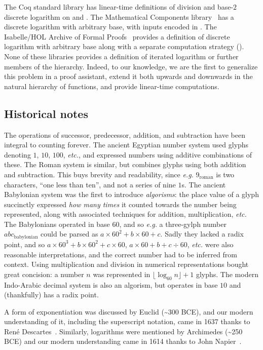 
%

The Coq standard library has linear-time definitions
of division and base-$2$ discrete logarithm on  and .
The Mathematical Components library~\cite{MathComp}
has a discrete logarithm with arbitrary base, with inputs encoded in .
The Isabelle/HOL Archive of Formal Proofs~\cite{isastan2019} 
provides a definition of discrete logarithm
with arbitrary base along with a separate computation strategy (\lstset{style=isaStyle}\li{[code]}\lstset{style=myStyle}).
None of these libraries provides a definition of iterated logarithm or
further members of the hierarchy.
Indeed, to our knowledge, we are the first to generalize this
problem in a proof assistant, extend it both
upwards and downwards in the natural hierarchy of functions, and
provide linear-time computations.

\subsection{Historical notes}
The operations of successor, predecessor, addition, and subtraction have
been integral to counting forever. The ancient Egyptian
number system used glyphs denoting $1$, $10$, $100$, \emph{etc.},
and expressed numbers using additive combinations of these.
The Roman system is similar, but
combines glyphs using both addition and subtraction.
This buys brevity and readability,
since \emph{e.g.} $9_{\text{roman}}$ is two characters, ``one less than ten'',
and not a series of nine $1$s.
The ancient Babylonian system was the first to introduce 
\emph{algorisms}: the place value of a glyph succinctly expressed \emph{how many times} 
it counted towards the number being represented, along with associated techniques for addition, multiplication, \emph{etc.}
The Babylonians operated in
base $60$, and so \emph{e.g.} a three-gylph number $abc_{\text{babylonian}}$ could
be parsed as $a \times 60^2 + b \times 60 + c$. Sadly they lacked
a radix point, and so
$a \times 60^3 + b \times 60^2 + c \times 60$, $a \times 60 + b + c \div 60$,
\emph{etc.} were also reasonable interpretations, and the correct number had
to be inferred from context.
Using multiplication and division in numerical representations bought great concision: a number $n$ was
represented in $\lfloor \log_{60}n \rfloor + 1$ glyphs.
The modern Indo-Arabic decimal system is also an algorism, 
but operates in base $10$ and (thankfully) has a radix point.

A form of exponentiation was discussed by Euclid (\textasciitilde 300 BCE), and our modern
understanding of it, including the superscript notation,
came in 1637 thanks to René Descartes~\cite{descartes}. 
Similarly, logarithms were mentioned by 
Archimedes (\textasciitilde 250 BCE) and our modern understanding came in 1614 thanks to 
John Napier~\cite{napier}.

